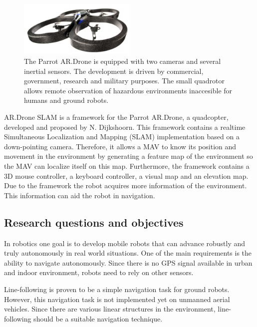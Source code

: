\documentclass[a4paper]{article}
\begin{document}
\begin{figure}[!h]
	\centering
	\includegraphics[width=0.5\textwidth]{images/ardrone.jpg}
	\caption{The Parrot AR.Drone is equipped with two cameras and several inertial sensors. The development is driven by commercial, government, research and military purposes. The small quadrotor allows remote observation of hazardous environments inaccesible for humans and ground robots.}
	\label{ardrone}
\end{figure}

AR.Drone SLAM is a framework for the Parrot AR.Drone, a quadcopter, developed and proposed by N. Dijkshoorn. This framework contains a realtime Simultaneous Localization and Mapping (SLAM) implementation based on a down-pointing camera. Therefore, it allows a MAV to know its position and movement in the environment by generating a feature map of the environment so the MAV can localize itself on this map. Furthermore, the framework contains a 3D mouse controller, a keyboard controller, a visual map and an elevation map. Due to the framework the robot acquires more information of the environment. This information can aid the robot in navigation.

\subsection{Research questions and objectives}
In robotics one goal is to develop mobile robots that can advance robustly and truly autonomously in real world situations. One of the main requirements is the ability to navigate autonomously. Since there is no GPS signal available in urban and indoor environment, robots need to rely on other sensors.

Line-following is proven to be a simple navigation task for ground robots. However, this navigation task is not implemented yet on unmanned aerial vehicles. Since there are various linear structures in the environment, line-following should be a suitable navigation technique.
\end{document}
